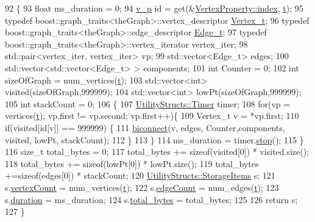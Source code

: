 \begin{DoxyCode}
92                                                       \{
93     \textcolor{keywordtype}{float} ms\_duration = 0;
94     \hyperlink{utilities_8h_a3f4959b3d837fa6351a9414c79280286}{v\_p} \textcolor{keywordtype}{id} = \textcolor{keyword}{get}(&\hyperlink{struct_utility_structs_1_1_vertex_property_a636cb729438e999aa3d9a17ac39d8641}{VertexProperty::index}, \hyperlink{class_tarjan_a54b0703f885a3514ea0bf4cdbc7fdaad}{t});
95     \textcolor{keyword}{typedef} boost::graph\_traits<theGraph>::vertex\_descriptor \hyperlink{class_graph_component_ae67114a6ce5a001dc35e1996e1b45aa0}{Vertex\_t};
96     \textcolor{keyword}{typedef} boost::graph\_traits<theGraph>::edge\_descriptor \hyperlink{utilities_8h_af4a84c740ebb77e6a13a00aa289b0018}{Edge\_t};
97     \textcolor{keyword}{typedef} boost::graph\_traits<theGraph>::vertex\_iterator vertex\_iter;
98     std::pair<vertex\_iter, vertex\_iter> vp;
99     std::vector<Edge\_t> edges;
100     std::vector<std::vector<Edge\_t> > components;
101     \textcolor{keywordtype}{int} Counter = 0;
102     \textcolor{keywordtype}{int} sizeOfGraph = num\_vertices(\hyperlink{class_tarjan_a54b0703f885a3514ea0bf4cdbc7fdaad}{t});
103     std::vector<int> visited(sizeOfGraph,999999);
104     std::vector<int> lowPt(sizeOfGraph,999999);
105     \textcolor{keywordtype}{int} stackCount = 0;
106     \{
107         \hyperlink{class_utility_structs_1_1_timer}{UtilityStructs::Timer} timer;
108         \textcolor{keywordflow}{for}(vp = vertices(\hyperlink{class_tarjan_a54b0703f885a3514ea0bf4cdbc7fdaad}{t}); vp.first != vp.second; vp.first++)\{
109             Vertex\_t v = *vp.first;
110             \textcolor{keywordflow}{if}(visited[\textcolor{keywordtype}{id}[v]] == 999999) \{
111                 \hyperlink{class_tarjan_a52573be5a4930ad84f3807bc49f42026}{biconnect}(v, edges, Counter,components, visited, lowPt, stackCount);
112             \}
113         \}
114         ms\_duration = timer.\hyperlink{class_utility_structs_1_1_timer_a12f62b57c263d563efd6089cff52355f}{stop}();
115     \}
116     \textcolor{keywordtype}{size\_t} total\_bytes = 0;
117     total\_bytes += \textcolor{keyword}{sizeof}(visited[0]) * visited.size();
118     total\_bytes += \textcolor{keyword}{sizeof}(lowPt[0]) * lowPt.size();
119     total\_bytes +=\textcolor{keyword}{sizeof}(edges[0]) * stackCount;
120     \hyperlink{struct_utility_structs_1_1_storage_items}{UtilityStructs::StorageItems} s;
121     s.\hyperlink{struct_utility_structs_1_1_storage_items_af72522be713f23fcfe3ac66780183fda}{vertexCount} = num\_vertices(\hyperlink{class_tarjan_a54b0703f885a3514ea0bf4cdbc7fdaad}{t});
122     s.\hyperlink{struct_utility_structs_1_1_storage_items_afafcba9bb103108e2c1e1d9254fb75c5}{edgeCount} = num\_edges(\hyperlink{class_tarjan_a54b0703f885a3514ea0bf4cdbc7fdaad}{t});
123     s.\hyperlink{struct_utility_structs_1_1_storage_items_a65e7df5611a4e144cc27576bd3041f6c}{duration} = ms\_duration;
124     s.\hyperlink{struct_utility_structs_1_1_storage_items_a39cf482db54d8e6ac473b438444c8a1e}{total\_bytes} = total\_bytes;
125     
126     \textcolor{keywordflow}{return} s;
127 \}
\end{DoxyCode}
